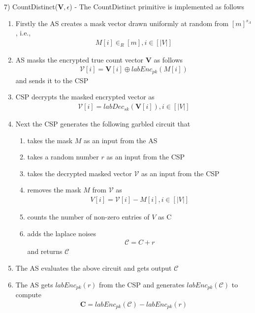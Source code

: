 7) \textsf{CountDistinct}($\mathbf{V},\epsilon$) - The \textsf{CountDistinct} primitive is implemented as follows \begin{enumerate}[label=\alph*)]\item Firstly the \textsf{AS} creates a mask vector drawn uniformly at random from $[m]^{s_A}$, i.e.,  \begin{gather*} M[i] \in_R [m], i \in [|V|]\end{gather*} \item \textsf{AS} masks the encrypted true count vector $\mathbf{V}$  as follows \begin{gather*}\boldsymbol{\mathcal{V}}[i]= \mathbf{V}[i] \oplus labEnc_{pk}(M[i])\end{gather*} and sends it to the \textsf{CSP} \item \textsf{CSP} decrypts the masked encrypted vector as \begin{gather*}\mathcal{V}[i]=labDec_{sk}(\mathbf{V}[i]), i \in [|V|]\end{gather*} \item Next the \textsf{CSP} generates the following garbled circuit that\begin{enumerate}[label=\roman*)]  \item takes the mask $M$ as an input from the \textsf{AS} \item takes a random number $r$  as an input from the \textsf{CSP}\item takes the decrypted masked vector $\mathcal{V}$ as an input from the \textsf{CSP} \item removes the mask $M$ from $\mathcal{V}$ as \begin{gather*}V[i]=\mathcal{V}[i]-M[i], i \in [|V|]\end{gather*}\item  counts the number of non-zero entries of $V$ as C \item adds the laplace noises \begin{gather*}\mathcal{C}=C+r\end{gather*} and returns $\mathcal{C}$ \end{enumerate} \item The \textsf{AS} evaluates the above circuit and gets output $\mathcal{C}$ \item The \textsf{AS} gets $labEnc_{pk}(r)$ from the \textsf{CSP} and generates $labEnc_{pk}(\mathcal{C})$ to compute\begin{gather*}\mathbf{C}=labEnc_{pk}(\mathcal{C})-labEnc_{pk}(r)\end{gather*} \end{enumerate} 


